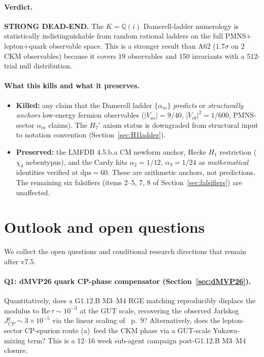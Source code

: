 \documentclass[a4paper,11pt]{article}
\newcommand{\Qi}{\mathbb{Q}(i)}
\theoremstyle{definition}
\theoremstyle{remark}
\begin{document}
\paragraph{Verdict.}
\textbf{STRONG DEAD-END.}  The $K=\Qi$ Damerell-ladder numerology
is statistically indistinguishable from random rational ladders
on the full PMNS$+$lepton$+$quark observable space.
This is a stronger result than A62 ($1.7\sigma$ on 2 CKM
observables) because it covers 19 observables and 150
invariants with a 512-trial null distribution.

\paragraph{What this kills and what it preserves.}
\begin{itemize}
  \item \textbf{Killed:} any claim that the Damerell ladder
    $\{\alpha_m\}$ \emph{predicts} or \emph{structurally anchors}
    low-energy fermion observables ($|V_{us}|=9/40$,
    $|V_{cb}|^2=1/600$, PMNS-sector $\alpha_m$ claims).
    The $H_7'$ axiom status is downgraded from structural input
    to notation convention (Section~\ref{sec:H1ladder}).
  \item \textbf{Preserved:} the LMFDB 4.5.b.a CM newform
    anchor, Hecke $H_1$ restriction ($\chi_4$ nebentypus), and
    the Cardy hits $\alpha_2=1/12$, $\alpha_3=1/24$ as
    \emph{mathematical} identities verified at $\mathrm{dps}=60$.
    These are arithmetic anchors, not predictions.
    The remaining six falsifiers (items 2--5, 7, 8 of
    Section~\ref{sec:falsifiers}) are unaffected.
\end{itemize}

\section{Outlook and open questions}
\label{sec:outlook}

We collect the open questions and conditional research
directions that remain after v7.5.

\paragraph{Q1: dMVP26 quark CP-phase compensator
(Section~\ref{sec:dMVP26}).}  Quantitatively, does a
G1.12.B M3--M4 RGE matching reproducibly displace the modulus
to $\mathrm{Re}\,\tau\sim 10^{-3}$ at the GUT scale, recovering
the observed Jarlskog $J_{CP}^{q}\sim 3\times 10^{-5}$ via the
linear scaling of \cite{dMVP26}~p.~9?  Alternatively, does the
lepton-sector CP-spurion route (a)~feed the CKM phase via a
GUT-scale Yukawa-mixing term?  This is a 12--16 week sub-agent
campaign post-G1.12.B M3--M4 closure.
\end{document}
